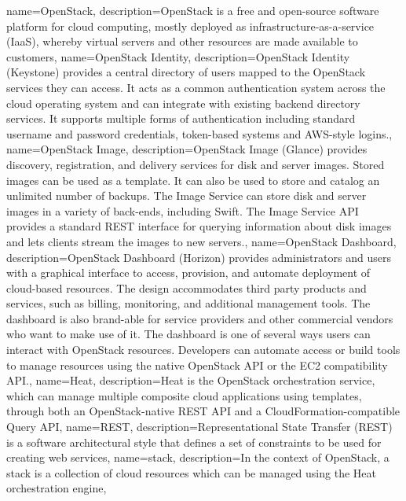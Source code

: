 {
  name={OpenStack},
  description={OpenStack is a free and open-source software platform for
  cloud computing, mostly deployed as infrastructure-as-a-service
  (IaaS), whereby virtual servers and other resources are made available
  to customers},
}
{
  name={OpenStack Identity},
  description={OpenStack Identity (Keystone) provides a central
  directory of users mapped to the OpenStack services they can
  access. It acts as a common authentication system across the cloud
  operating system and can integrate with existing backend directory
  services. It supports multiple forms of authentication including
  standard username and password credentials, token-based systems and
  AWS-style logins.},
}
{
  name={OpenStack Image},
  description={OpenStack Image (Glance) provides discovery,
  registration, and delivery services for disk and server images. Stored
  images can be used as a template. It can also be used to store and
  catalog an unlimited number of backups. The Image Service can store
  disk and server images in a variety of back-ends, including Swift. The
  Image Service API provides a standard \gls{REST} interface for
  querying information about disk images and lets clients stream the
  images to new servers.},
}
{
  name={OpenStack Dashboard},
  description={OpenStack Dashboard (Horizon) provides administrators and
  users with a graphical interface to access, provision, and automate
  deployment of cloud-based resources. The design accommodates third
  party products and services, such as billing, monitoring, and
  additional management tools. The dashboard is also brand-able for
  service providers and other commercial vendors who want to make use of
  it. The dashboard is one of several ways users can interact with
  OpenStack resources. Developers can automate access or build tools to
  manage resources using the native OpenStack API or the EC2
  compatibility API.},
}
{
  name={Heat},
  description={Heat is the OpenStack orchestration service, which can
  manage multiple composite cloud applications using templates,
  through both an OpenStack-native \gls{REST} API and a
  CloudFormation-compatible Query API},
}
{
  name={REST},
  description={Representational State Transfer (REST) is a software
  architectural style that defines a set of constraints to be used for
  creating web services},
}
{
  name={stack},
  description={In the context of \gls{OpenStack}, a stack is a
  collection of cloud resources which can be managed using the
  \gls{Heat} orchestration engine},
}
